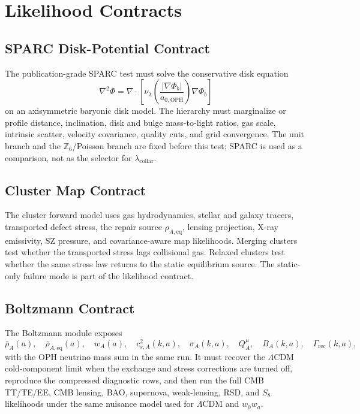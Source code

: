 \documentclass[11pt]{article}
\newcommand{\LCDM}{\Lambda\mathrm{CDM}}
\newcommand{\aoph}{a_{0,\mathrm{OPH}}}
\newcommand{\lambdac}{\lambda_{\mathrm{collar}}}
\newcommand{\Zsix}{\mathbb Z_6}
\begin{document}
\section{Likelihood Contracts}

\subsection{SPARC Disk-Potential Contract}

The publication-grade SPARC test must solve the conservative disk equation
\begin{equation}
  \nabla^2\Phi
  =
  \nabla\cdot
  \left[
    \nu_\lambda\!\left(\frac{|\nabla\Phi_b|}{\aoph}\right)
    \nabla\Phi_b
  \right]
\end{equation}
on an axisymmetric baryonic disk model.  The hierarchy must marginalize or
profile distance, inclination, disk and bulge mass-to-light ratios, gas scale,
intrinsic scatter, velocity covariance, quality cuts, and grid convergence.
The unit branch and the \(\Zsix\)/Poisson branch are fixed before this test;
SPARC is used as a comparison, not as the selector for \(\lambdac\).

\subsection{Cluster Map Contract}

The cluster forward model uses gas hydrodynamics, stellar and galaxy tracers,
transported defect stress, the repair source
\(\rho_{A,\mathrm{eq}}\), lensing projection, X-ray emissivity, SZ pressure,
and covariance-aware map likelihoods.  Merging clusters test whether the
transported stress lags collisional gas.  Relaxed clusters test whether the
same stress law returns to the static equilibrium source.  The static-only
failure mode is part of the likelihood contract.

\subsection{Boltzmann Contract}

The Boltzmann module exposes
\[
  \bar\rho_A(a),\quad
  \bar\rho_{A,\mathrm{eq}}(a),\quad
  w_A(a),\quad
  c_{s,A}^2(k,a),\quad
  \sigma_A(k,a),\quad
  Q_A^\mu,\quad
  B_A(k,a),\quad
  \Gamma_{\mathrm{rec}}(k,a),
\]
with the OPH neutrino mass sum in the same run.  It must recover the
\(\LCDM\) cold-component limit when the exchange and stress corrections are
turned off, reproduce the compressed diagnostic rows, and then run the full
CMB TT/TE/EE, CMB lensing, BAO, supernova, weak-lensing, RSD, and \(S_8\)
likelihoods under the same nuisance model used for \(\LCDM\) and \(w_0w_a\).
\end{document}
